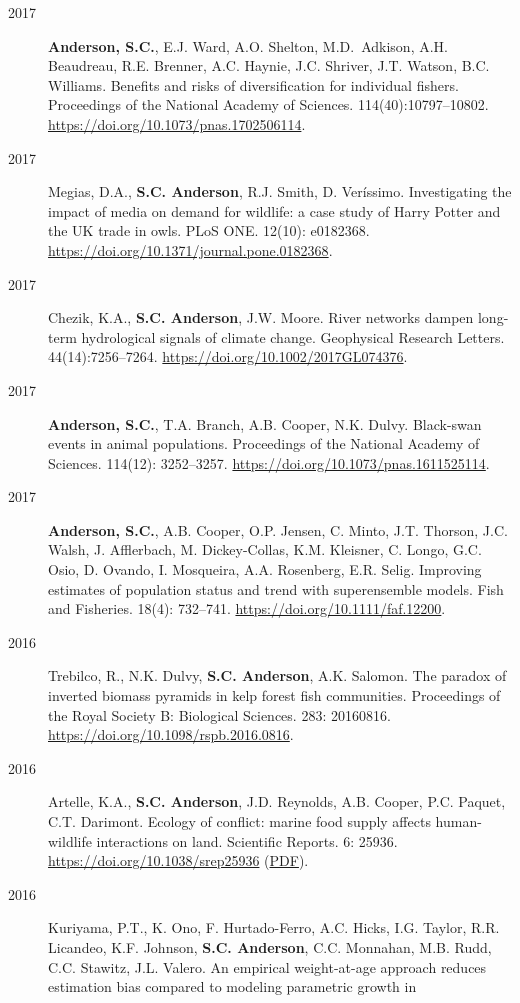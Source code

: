\begin{description}
\item[2017]
\textbf{Anderson, S.C.}, E.J. Ward, A.O. Shelton, M.D.\ Adkison, A.H.
Beaudreau, R.E. Brenner, A.C. Haynie, J.C. Shriver, J.T. Watson, B.C.
Williams. Benefits and risks of diversification for individual fishers.
Proceedings of the National Academy of Sciences. 114(40):10797--10802.
\url{https://doi.org/10.1073/pnas.1702506114}.
\item[2017]
Megias, D.A., \textbf{S.C. Anderson}, R.J. Smith, D. Veríssimo.
Investigating the impact of media on demand for wildlife: a case study
of Harry Potter and the UK trade in owls. PLoS ONE. 12(10): e0182368.
\url{https://doi.org/10.1371/journal.pone.0182368}.
\item[2017]
Chezik, K.A., \textbf{S.C. Anderson}, J.W. Moore. River networks dampen
long-term hydrological signals of climate change. Geophysical Research
Letters. 44(14):7256--7264. \url{https://doi.org/10.1002/2017GL074376}.
\item[2017]
\textbf{Anderson, S.C.}, T.A. Branch, A.B. Cooper, N.K. Dulvy.
Black-swan events in animal populations. Proceedings of the National
Academy of Sciences. 114(12): 3252--3257.
\url{https://doi.org/10.1073/pnas.1611525114}.
\item[2017]
\textbf{Anderson, S.C.}, A.B. Cooper, O.P. Jensen, C. Minto, J.T.
Thorson, J.C. Walsh, J. Afflerbach, M. Dickey-Collas, K.M. Kleisner, C.
Longo, G.C. Osio, D. Ovando, I. Mosqueira, A.A. Rosenberg, E.R. Selig.
Improving estimates of population status and trend with superensemble
models. Fish and Fisheries. 18(4): 732--741.
\url{https://doi.org/10.1111/faf.12200}.
\item[2016]
Trebilco, R., N.K. Dulvy, \textbf{S.C. Anderson}, A.K. Salomon. The
paradox of inverted biomass pyramids in kelp forest fish communities.
Proceedings of the Royal Society B: Biological Sciences. 283: 20160816.
\url{https://doi.org/10.1098/rspb.2016.0816}.
\item[2016]
Artelle, K.A., \textbf{S.C. Anderson}, J.D. Reynolds, A.B. Cooper, P.C.
Paquet, C.T. Darimont. Ecology of conflict: marine food supply affects
human-wildlife interactions on land. Scientific Reports. 6: 25936.
\url{https://doi.org/10.1038/srep25936}
(\href{http://www.nature.com/articles/srep25936.pdf}{PDF}).
\item[2016]
Kuriyama, P.T., K. Ono, F. Hurtado-Ferro, A.C. Hicks, I.G. Taylor, R.R.
Licandeo, K.F. Johnson, \textbf{S.C. Anderson}, C.C. Monnahan, M.B.
Rudd, C.C. Stawitz, J.L. Valero. An empirical weight-at-age approach
reduces estimation bias compared to modeling parametric growth in

\end{description}
